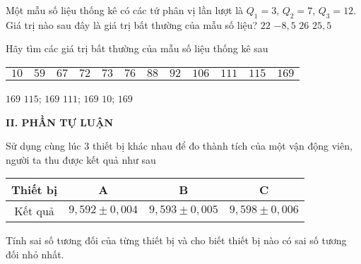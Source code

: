 \begin{ex}%
	Một mẫu số liệu thống kê có các tứ phân vị lần lượt là $Q_1=3$, $Q_2= 7$, 
	$Q_3= 12$. Giá trị nào sau đây  là giá trị bất thường 
	của mẫu số liệu?
	\choice
	{$22$}
	{$-8{,}5$}
	{\True $26$}
	{$25{,}5$} 
\end{ex}

\begin{ex}%
	Hãy tìm các giá trị bất thường của mẫu số liệu thống kê sau
	\begin{center}	
		\begin{tabular}{cccccccccccc}
			$10$ & $59$ & $67$ & $72$ & $73$ & $76$  & $88$ & $92$ & $106$& $111$ & $115$ & $169$ 
		\end{tabular} 
	\end{center}
	\choice
	{$169$}
	{$115$; $169$}
	{$111$; $169$}
	{\True $10$; $169$} 
\end{ex}




\noindent\textbf{II. PHẦN TỰ LUẬN}

\begin{bt}%
Sử dụng cùng lúc 3 thiết bị khác nhau để đo thành tích của một vận động viên, người ta thu được kết quả như sau
\begin{center}
\begin{tabular}{|c|c|c|c|}
\hline 
Thiết bị & A & B & C \\ 
\hline 
Kết quả & $9{,}592 \pm 0{,}004$ & $9{,}593\pm 0{,}005$ & $9{,}598 \pm 0{,}006$ \\ 
\hline 
\end{tabular} 
\end{center}
Tính sai số tương đối của từng thiết bị và cho biết thiết bị nào có sai số tương đối nhỏ nhất.
\end{bt}

